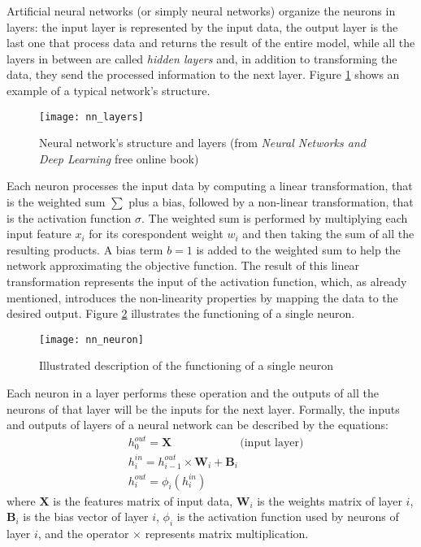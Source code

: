 Artificial neural networks (or simply neural networks) organize the neurons in layers: the input layer is represented by the input data, the output layer is the last one that process data and returns the result of the entire model, while all the layers in between are called \textit{hidden layers} and, in addition to transforming the data, they send the processed information to the next layer. Figure \ref{fig:nn_layers} shows an example of a typical network's structure.
\begin{figure}[htbp]
    \centering
    \texttt{[image: nn\_layers]}
    \caption{Neural network's structure and layers (from \textit{Neural Networks and Deep Learning} free online book)}
    \label{fig:nn_layers}
\end{figure}
Each neuron processes the input data by computing a linear transformation, that is the weighted sum $\sum$ plus a bias, followed by a non-linear transformation, that is the activation function $\sigma$. The weighted sum is performed by multiplying each input feature $x_i$ for its corespondent weight $w_i$ and then taking the sum of all the resulting products. A bias term $b = 1$ is added to the weighted sum to help the network approximating the objective function. The result of this linear transformation represents the input of the activation function, which, as already mentioned, introduces the non-linearity properties by mapping the data to the desired output. Figure \ref{fig:nn_neuron} illustrates the functioning of a single neuron. 
\begin{figure}[htbp]
    \centering
    \texttt{[image: nn\_neuron]}
    \caption{Illustrated description of the functioning of a single neuron}
    \label{fig:nn_neuron}
\end{figure}
Each neuron in a layer performs these operation and the outputs of all the neurons of that layer will be the inputs for the next layer. Formally, the inputs and outputs of layers of a neural network can be described by the equations:
\begin{align}
    &h^{\textit{out}}_{0} = \mathbf{X}\qquad\qquad\qquad \text{(input layer)}\\
    &h^{\textit{in}}_{i} = h^{\textit{out}}_{i-1} \times \mathbf{W}_i + \mathbf{B}_i\\
    &h^{\textit{out}}_{i} = \phi_i (h^{\textit{in}}_{i})
\end{align}
where $\mathbf{X}$ is the features matrix of input data, $\mathbf{W}_i$ is the weights matrix of layer $i$, $\mathbf{B}_i$ is the bias vector of layer $i$, $\phi_i$ is the activation function used by neurons of layer $i$, and the operator $\times$ represents matrix multiplication.

